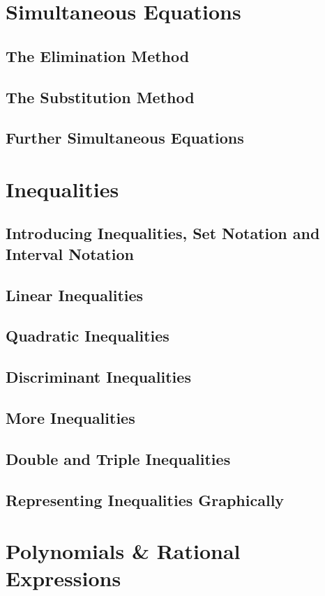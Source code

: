 \documentclass[../maths.tex]{subfiles}
\begin{document}
\section{Simultaneous Equations}
\subsection*{The Elimination Method}
\subsection*{The Substitution Method}
\subsection*{Further Simultaneous Equations}
\section{Inequalities}
\subsection*{Introducing Inequalities, Set Notation and Interval Notation}
\subsection*{Linear Inequalities}
\subsection*{Quadratic Inequalities}
\subsection*{Discriminant Inequalities}
\subsection*{More Inequalities}
\subsection*{Double and Triple Inequalities}
\subsection*{Representing Inequalities Graphically}
\section{Polynomials \& Rational Expressions}
\end{document}
